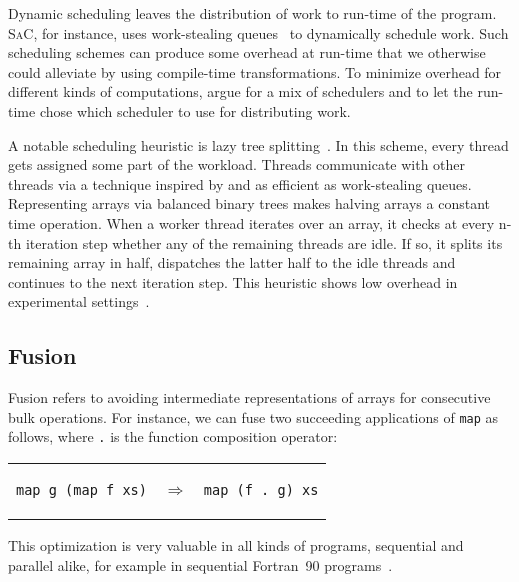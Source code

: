 \documentclass[a4paper]{article}
\newcommand{\sac}{S\textsc{a}C}
\begin{document}
Dynamic scheduling leaves the distribution of work to run-time of the program. \sac{}, for instance, uses work-stealing queues~\cite{Chase2005Dynamic, Grelck:2007:SOS:1248648.1248654} to dynamically schedule work. Such scheduling schemes can produce some overhead at run-time that we otherwise could alleviate by using compile-time transformations. To minimize overhead for different kinds of computations, \citet{Fluet:2008:SFG:1411204.1411239} argue for a mix of schedulers and to let the run-time chose which scheduler to use for distributing work.

A notable scheduling heuristic is lazy tree splitting~\cite{Bergstrom:2010:LTS:1863543.1863558}. In this scheme, every thread gets assigned some part of the workload. Threads communicate with other threads via a technique inspired by and as efficient as work-stealing queues. Representing arrays via balanced binary trees makes halving arrays a constant time operation. When a worker thread iterates over an array, it checks at every n-th iteration step whether any of the remaining threads are idle. If so, it splits its remaining array in half, dispatches the latter half to the idle threads and continues to the next iteration step. This heuristic shows low overhead in experimental settings~\cite{Bergstrom:2010:LTS:1863543.1863558}.

\subsection{Fusion}
\label{sec:fusion}

Fusion refers to avoiding intermediate representations of arrays for consecutive bulk operations. For instance, we can fuse two succeeding applications of \texttt{map} as follows, where \texttt{.} is the function composition operator:

\begin{center}
  \begin{tabular}{ccc}
\begin{lstlisting}[language=ML]
map g (map f xs)
\end{lstlisting}
    & $\Longrightarrow$ &
\begin{lstlisting}[language=ML]
map (f . g) xs
\end{lstlisting}
  \end{tabular}
\end{center}

This optimization is very valuable in all kinds of programs, sequential and parallel alike, for example in sequential Fortran~90 programs~\cite{Hwang:1995:AOS:209936.209949}.
\end{document}
